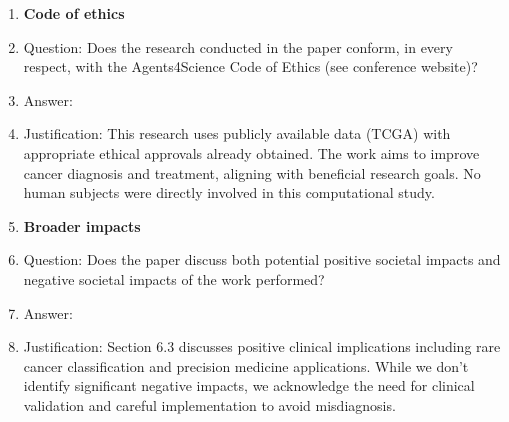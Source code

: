 \documentclass{article}
\begin{document}
\begin{enumerate}
\item {\bf Code of ethics}
    \item[] Question: Does the research conducted in the paper conform, in every respect, with the Agents4Science Code of Ethics (see conference website)?
    \item[] Answer: \answerYes{}
    \item[] Justification: This research uses publicly available data (TCGA) with appropriate ethical approvals already obtained. The work aims to improve cancer diagnosis and treatment, aligning with beneficial research goals. No human subjects were directly involved in this computational study.

\item {\bf Broader impacts}
    \item[] Question: Does the paper discuss both potential positive societal impacts and negative societal impacts of the work performed?
    \item[] Answer: \answerYes{}
    \item[] Justification: Section 6.3 discusses positive clinical implications including rare cancer classification and precision medicine applications. While we don't identify significant negative impacts, we acknowledge the need for clinical validation and careful implementation to avoid misdiagnosis.

\end{enumerate}
\end{document}

